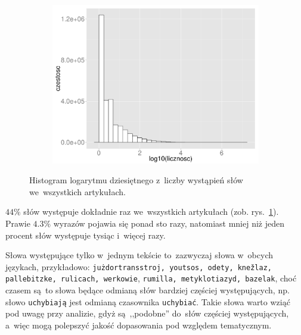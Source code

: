 \documentclass{praca1}
\begin{document}
\begin{figure}[!h]
  \centering
  \includegraphics[width=350pt, height=200pt]{plot2.pdf}\\
  \caption{Histogram logarytmu dziesiętnego z~liczby wystąpień słów we~wszystkich artykułach.}\label{plot:002}
\end{figure}

$44\%$ słów występuje dokładnie raz we~wszystkich artykułach (zob. rys.~\ref{plot:002}). Prawie $4.3\%$ wyrazów pojawia się ponad sto razy, natomiast mniej niż jeden procent słów występuje tysiąc i~więcej razy.

Słowa występujące tylko w~jednym tekście to~zazwyczaj słowa w~obcych językach, przykładowo: \verb|jużdortransstroj, youtsos, odety, knežlaz, pallebitzke, rulicach, werkowie|, \verb|rumilla, metyklotiazyd, bazelak|,
choć czasem są~to słowa będące odmianą słów bardziej częściej występujących, np. słowo \verb|uchybiają| jest odmianą czasownika \verb|uchybiać|. Takie słowa warto wziąć pod uwagę przy analizie, gdyż są~,,podobne'' do~słów częściej występujących, a~więc mogą polepszyć jakość dopasowania pod względem tematycznym.
\end{document}
